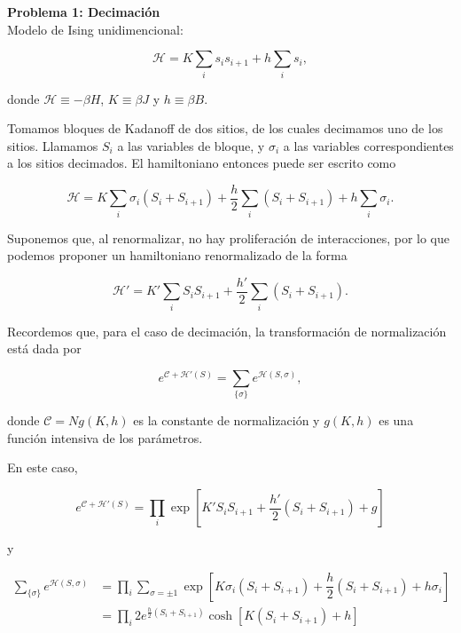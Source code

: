 \documentclass[10pt]{article}
\begin{document}
\textbf{Problema 1: Decimaci\'on}
\\

Modelo de Ising unidimencional:

\begin{equation}
\mathcal{H} = K \sum_i s_i s_{i+1} + h \sum_i s_i,
\end{equation}

donde $\mathcal{H} \equiv -\beta H$, $K\equiv \beta J$ y $h \equiv \beta B$.

Tomamos bloques de Kadanoff de dos sitios, de los cuales decimamos uno de los sitios. Llamamos $S_i$ a las variables de bloque, y $\sigma_i$ a las variables correspondientes a los sitios decimados. El hamiltoniano entonces puede ser escrito como

\begin{equation}
\mathcal{H} = K \sum_i \sigma_i (S_i + S_{i+1}) + \dfrac{h}{2} \sum_i (S_i + S_{i+1}) + h \sum_i \sigma_i.
\end{equation}

Suponemos que, al renormalizar, no hay proliferaci\'on de interacciones, por lo que podemos proponer un hamiltoniano renormalizado de la forma

\begin{equation}
\mathcal{H}' = K' \sum_i S_i S_{i+1} + \dfrac{h'}{2} \sum_i (S_i + S_{i+1}).
\end{equation}

Recordemos que, para el caso de decimaci\'on, la transformaci\'on de normalizaci\'on est\'a dada por 

\begin{equation}
e^{\mathcal{C} + \mathcal{H}'(S)} = \sum_{\lbrace \sigma\rbrace} e^{\mathcal{H}(S,\sigma)},
\end{equation}

donde $\mathcal{C} = Ng(K,h)$ es la constante de normalizaci\'on y $g(K,h)$ es una funci\'on intensiva de los par\'ametros.

En este caso,

\begin{equation}
e^{\mathcal{C} + \mathcal{H}'(S)} = \prod_i \exp\left[  K' S_i S_{i+1} + \dfrac{h'}{2} (S_i + S_{i+1}) + g \right]
\end{equation}

y

\begin{align}
\sum_{\lbrace \sigma \rbrace} e^{\mathcal{H}(S,\sigma)} &= \prod_i \sum_{\sigma=\pm 1} \exp\left[  K \sigma_i (S_i + S_{i+1}) + \dfrac{h}{2} (S_i + S_{i+1}) + h \sigma_i \right] \nonumber \\
&=  \prod_i 2 e^{\frac{h}{2} (S_i + S_{i+1}) }  \cosh\left[ K (S_i + S_{i+1}) + h \right] \nonumber
\end{align}
\end{document}
